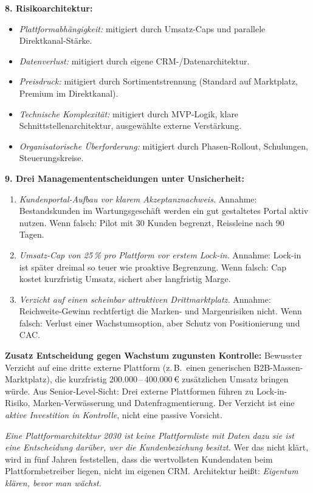 \documentclass[11pt,a4paper,oneside]{article}
\begin{document}
\begin{loesungbox}
\textbf{8. Risikoarchitektur:}
\begin{itemize}
  \item \emph{Plattformabhängigkeit:} mitigiert durch Umsatz-Caps und parallele Direktkanal-Stärke.
  \item \emph{Datenverlust:} mitigiert durch eigene CRM-/Datenarchitektur.
  \item \emph{Preisdruck:} mitigiert durch Sortimentstrennung (Standard auf Marktplatz, Premium im Direktkanal).
  \item \emph{Technische Komplexität:} mitigiert durch MVP-Logik, klare Schnittstellenarchitektur, ausgewählte externe Verstärkung.
  \item \emph{Organisatorische Überforderung:} mitigiert durch Phasen-Rollout, Schulungen, Steuerungskreise.
\end{itemize}

\textbf{9. Drei Managemententscheidungen unter Unsicherheit:}
\begin{enumerate}
  \item \emph{Kundenportal-Aufbau vor klarem Akzeptanznachweis.} Annahme: Bestandskunden im Wartungsgeschäft werden ein gut gestaltetes Portal aktiv nutzen. Wenn falsch: Pilot mit 30 Kunden begrenzt, Reissleine nach 90 Tagen.
  \item \emph{Umsatz-Cap von 25\,\% pro Plattform vor erstem Lock-in.} Annahme: Lock-in ist später dreimal so teuer wie proaktive Begrenzung. Wenn falsch: Cap kostet kurzfristig Umsatz, sichert aber langfristig Marge.
  \item \emph{Verzicht auf einen scheinbar attraktiven Drittmarktplatz.} Annahme: Reichweite-Gewinn rechtfertigt die Marken- und Margenrisiken nicht. Wenn falsch: Verlust einer Wachstumsoption, aber Schutz von Positionierung und CAC.
\end{enumerate}

\textbf{Zusatz \textendash{} Entscheidung gegen Wachstum zugunsten Kontrolle:}
Bewusster Verzicht auf eine dritte externe Plattform (z.\,B.\ einen generischen B2B-Massen-Marktplatz), die kurzfristig 200.000\,--\,400.000\,\euro{} zusätzlichen Umsatz bringen würde. Aus Senior-Level-Sicht: Drei externe Plattformen führen zu Lock-in-Risiko, Marken-Verwässerung und Datenfragmentierung. Der Verzicht ist eine \emph{aktive Investition in Kontrolle}, nicht eine passive Vorsicht.

\begin{merkbox}
\emph{Eine Plattformarchitektur 2030 ist keine Plattformliste mit Daten dazu \textendash{} sie ist eine Entscheidung darüber, wer die Kundenbeziehung besitzt.} Wer das nicht klärt, wird in fünf Jahren feststellen, dass die wertvollsten Kundendaten beim Plattformbetreiber liegen, nicht im eigenen CRM. Architektur heißt: \emph{Eigentum klären, bevor man wächst.}
\end{merkbox}
\end{loesungbox}
\end{document}
